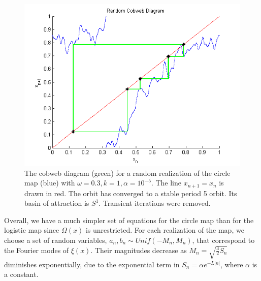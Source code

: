 \begin{figure}[!h]
\caption[Random circle map, stable orbit]{The cobweb
  diagram (green) for a random realization of the circle map (blue) with $\omega =
  0.3, k=1, \alpha = 10^{-5}$. The line $x_{n+1}=x_n$ is drawn in red. The orbit
  has converged to a stable period 5 orbit. Its basin of attraction is
  $S^1$. Transient iterations were removed.}\label{fig:rcircstable}
	\begin{center}
		\includegraphics[scale=0.7]{figs/randcirc_cobweb.png}
	\end{center}
\end{figure}

Overall, we have a much simpler set of equations for the circle map
than for the logistic map since $\Omega(x)$ is unrestricted. For each realization of the map, we choose
a set of random variables, $a_n, b_n \sim Unif(-M_n,M_n)$, that
correspond to the Fourier modes of $\xi(x)$. Their magnitudes decrease
as $M_n=\sqrt{\frac{3}{2}S_n}$ diminishes exponentially, due to the
exponential term in $S_n=\alpha e^{-L|n|}$, where $\alpha$ is a constant. 





